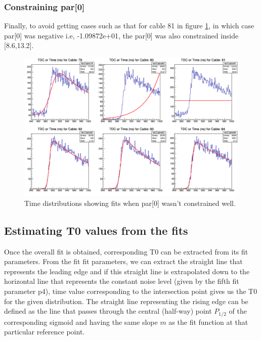 \documentclass[12pt,epsfig]{article}
\begin{document}
\subsubsection{Constraining par[0]}
Finally, to avoid getting cases such as that for cable 81 in figure \ref{tdcNoSigm}, 
in which case par[0] was negative i.e, -1.09872e+01, the par[0] was also constrained inside [8.6,13.2].
\begin{figure}
    \centering
    \includegraphics[width=1.0\textwidth]{Figures/tdcForRun068_Cables79to84nw0.png}
    \caption{Time distributions showing fits when par[0] wasn't constrained well.}
    \label{tdcNoSigm}
\end{figure}




\subsection{Estimating T0 values from the fits}

Once the overall fit is obtained, corresponding T0 can be extracted from its fit parameters. From the fit
fit parameters, we can extract the straight line that represents the leading edge and if this straight line
is extrapolated down to the horizontal line that represents the constant noise level (given by the fifth
fit parameter p4), time value corresponding to the intersection point gives us the T0 for the given
distribution. The straight line representing the rising edge can be defined as the line that passes through the
central (half-way) point $P_{1/2}$ of the corresponding sigmoid and having the same slope $m$ as the
fit function at that particular reference point.
\end{document}
